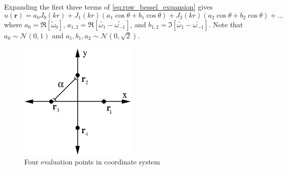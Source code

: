 \documentclass{report}
\newcommand{\rr}[0]{\mathbf{r}}
\begin{document}
Expanding the first three terms of \ref{eq:rpw_bessel_expansion} gives
\[
u(\rr) = a_{0} J_{0}(kr) + J_{1}(kr) (a_{1} \cos{\theta} + b_{1} \cos{\theta}) + J_{2}(kr) (a_{2} \cos{\theta} + b_{2} \cos{\theta}) + \ldots
\]
where $a_{0} = \Re \left[ \tilde{\omega}_{0} \right]$, $a_{1,2} = \Re \left[ \tilde{\omega_{1}} - \tilde{\omega_{-1}} \right]$, and $b_{1,2} = \Im \left[ \tilde{\omega_{1}} - \tilde{\omega_{-1}} \right]$. Note that $a_{0} \sim \mathcal{N}(0,1)$ and $a_{1}, b_{1}, a_{2} \sim \mathcal{N}(0,\sqrt{2})$.

\begin{figure}
  \begin{center}
    \includegraphics[width=0.5\textwidth]{figs/interpolation/four_points_on_axes.eps}
    \caption{Four evaluation points in coordinate system}
    \label{fig:four_points}
  \end{center}
\end{figure}
\end{document}
